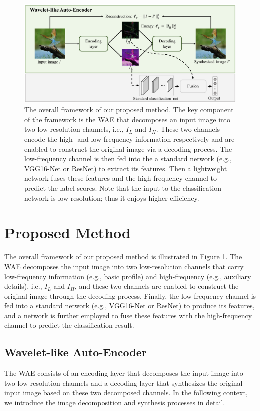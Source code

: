 \documentclass[letterpaper]{article} %
\begin{document}
\begin{figure}[htbp]
   \centering
   \includegraphics[width=0.75\linewidth]{framework_v2.pdf}
   \caption{The overall framework of our proposed method. The key component of the framework is the WAE that decomposes an input image into two low-resolution channels, i.e., $I_L$ and $I_H$. These two channels encode the high- and low-frequency information respectively and are enabled to construct the original image via a decoding process. The low-frequency channel is then fed into the a standard network (e.g., VGG16-Net or ResNet) to extract its features. Then a lightweight network fuses these features and the high-frequency channel to predict the label scores. Note that the input to the classification network is low-resolution; thus it enjoys higher efficiency.}
   \label{fig:cls_net}
\end{figure}

\section{Proposed Method}
The overall framework of our proposed method is illustrated in Figure \ref{fig:cls_net}. The WAE decomposes the input image into two low-resolution channels that carry low-frequency information (e.g., basic profile) and high-frequency (e.g., auxiliary details), i.e., $I_L$ and $I_H$, and these two channels are enabled to construct the original image through the decoding process. Finally, the low-frequency channel is fed into a standard network (e.g., VGG16-Net or ResNet) to produce its features, and a network is further employed to fuse these features with the high-frequency channel to predict the classification result.

\subsection{Wavelet-like Auto-Encoder}
The WAE consists of an encoding layer that decomposes the input image into two low-resolution channels and a decoding layer that synthesizes the original input image based on these two decomposed channels. In the following context, we introduce the image decomposition and synthesis processes in detail.
\end{document}
